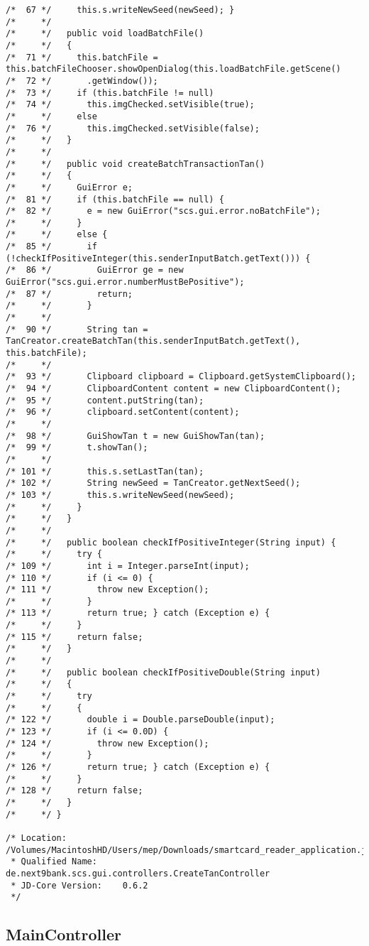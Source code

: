 \begin{lstlisting}
/*  67 */     this.s.writeNewSeed(newSeed); }
/*     */ 
/*     */   public void loadBatchFile()
/*     */   {
/*  71 */     this.batchFile = this.batchFileChooser.showOpenDialog(this.loadBatchFile.getScene()
/*  72 */       .getWindow());
/*  73 */     if (this.batchFile != null)
/*  74 */       this.imgChecked.setVisible(true);
/*     */     else
/*  76 */       this.imgChecked.setVisible(false);
/*     */   }
/*     */ 
/*     */   public void createBatchTransactionTan()
/*     */   {
/*     */     GuiError e;
/*  81 */     if (this.batchFile == null) {
/*  82 */       e = new GuiError("scs.gui.error.noBatchFile");
/*     */     }
/*     */     else {
/*  85 */       if (!checkIfPositiveInteger(this.senderInputBatch.getText())) {
/*  86 */         GuiError ge = new GuiError("scs.gui.error.numberMustBePositive");
/*  87 */         return;
/*     */       }
/*     */ 
/*  90 */       String tan = TanCreator.createBatchTan(this.senderInputBatch.getText(), this.batchFile);
/*     */ 
/*  93 */       Clipboard clipboard = Clipboard.getSystemClipboard();
/*  94 */       ClipboardContent content = new ClipboardContent();
/*  95 */       content.putString(tan);
/*  96 */       clipboard.setContent(content);
/*     */ 
/*  98 */       GuiShowTan t = new GuiShowTan(tan);
/*  99 */       t.showTan();
/*     */ 
/* 101 */       this.s.setLastTan(tan);
/* 102 */       String newSeed = TanCreator.getNextSeed();
/* 103 */       this.s.writeNewSeed(newSeed);
/*     */     }
/*     */   }
/*     */ 
/*     */   public boolean checkIfPositiveInteger(String input) {
/*     */     try {
/* 109 */       int i = Integer.parseInt(input);
/* 110 */       if (i <= 0) {
/* 111 */         throw new Exception();
/*     */       }
/* 113 */       return true; } catch (Exception e) {
/*     */     }
/* 115 */     return false;
/*     */   }
/*     */ 
/*     */   public boolean checkIfPositiveDouble(String input)
/*     */   {
/*     */     try
/*     */     {
/* 122 */       double i = Double.parseDouble(input);
/* 123 */       if (i <= 0.0D) {
/* 124 */         throw new Exception();
/*     */       }
/* 126 */       return true; } catch (Exception e) {
/*     */     }
/* 128 */     return false;
/*     */   }
/*     */ }

/* Location:           /Volumes/MacintoshHD/Users/mep/Downloads/smartcard_reader_application.jar
 * Qualified Name:     de.next9bank.scs.gui.controllers.CreateTanController
 * JD-Core Version:    0.6.2
 */
\end{lstlisting}

\subsection{MainController}

